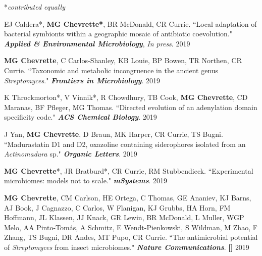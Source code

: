 


\begin{cvpubs}

\cvpub
{\hspace{-1cm} *\textit{contributed equally}} %
{}

\cvpub
{EJ Caldera*, \textbf{MG Chevrette*}, BR McDonald, CR Currie. ``Local adaptation of bacterial symbionts within a geographic mosaic of antibiotic coevolution." \textit{\textbf{Applied \& Environmental Microbiology}}, \textit{In press}.}
{2019}

\cvpub
{\textbf{MG Chevrette}, C Carlos-Shanley, KB Louie, BP Bowen, TR Northen, CR Currie. ``Taxonomic and metabolic incongruence in the ancient genus \textit{Streptomyces}." \textit{\textbf{Frontiers in Microbiology}}. \textbf{\textit{}}}
{2019}

\end{cvpubs} \begin{cvpubs}

\cvpub
{K Throckmorton*, V Vinnik*, R Chowdhury, TB Cook, \textbf{MG Chevrette}, CD Maranas, BF Pfleger, MG Thomas. ``Directed evolution of an adenylation domain specificity code." \textit{\textbf{ACS Chemical Biology}}. \textbf{\textit{}}}
{2019}

\cvpub
{J Yan, \textbf{MG Chevrette}, D Braun, MK Harper, CR Currie, TS Bugni. ``Madurastatin D1 and D2, oxazoline containing siderophores isolated from an \textit{Actinomadura} sp." \textit{\textbf{Organic Letters}}. \textbf{\textit{}}}
{2019}

\cvpub
{\textbf{MG Chevrette}*, JR Bratburd*, CR Currie, RM Stubbendieck. ``Experimental microbiomes: models not to scale." \textit{\textbf{mSystems}}. \textbf{\textit{}}}
{2019}

\cvpub
{\textbf{MG Chevrette}, CM Carlson, HE Ortega, C Thomas, GE Ananiev, KJ Barns, AJ Book, J Cagnazzo, C Carlos, W Flanigan, KJ Grubbs, HA Horn, FM Hoffmann, JL Klassen, JJ Knack, GR Lewin, BR McDonald, L Muller, WGP Melo, AA Pinto-Tom\'{a}s, A Schmitz, E Wendt-Pienkowski, S Wildman, M Zhao, F Zhang, TS Bugni, DR Andes, MT Pupo, CR Currie. ``The antimicrobial potential of \textit{Streptomyces} from insect microbiomes." \textit{\textbf{Nature Communications}}. \textbf{\textit{}} \linebreak \textbf{[\textit{}]}}
{2019}


\end{cvpubs}
